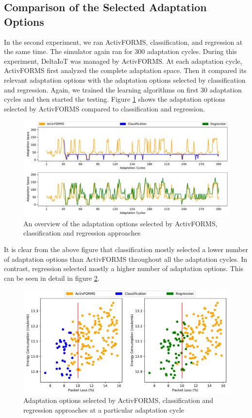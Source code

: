 \documentclass[a4paper,12pt]{article}
\begin{document}
\subsection{Comparison of the Selected Adaptation Options}
In the second experiment, we ran ActivFORMS, classification, and regression at the same time. The simulator again ran for 300 adaptation cycles. During this experiment, DeltaIoT was managed by ActivFORMS. At each adaptation cycle, ActivFORMS first analyzed the complete adaptation space. Then it compared its relevant adaptation options with the adaptation options selected by classification and regression. Again, we trained the learning algorithms on first 30 adaptation cycles and then started the testing. Figure \ref{OnlineLearning} shows the adaptation options selected by ActivFORMS compared to classification and regression.
\begin{figure}[H]
	\centering
	\includegraphics[keepaspectratio, width=\linewidth]{graphs/OnlineLearning.pdf}
	\caption{An overview of the adaptation options selected by ActivFORMS, classification and regression approaches}
	\label{OnlineLearning}
\end{figure}
It is clear from the above figure that classification mostly selected a lower number of adaptation options than ActivFORMS throughout all the adaptation cycles. In contrast, regression selected mostly a higher number of adaptation options. This can be seen in detail in figure \ref{RelevantOptions}.
\begin{figure}[H]
	\centering
	\includegraphics[keepaspectratio, width=\linewidth]{graphs/SelectedAdaptationOptions.pdf}
	\caption{Adaptation options selected by ActivFORMS, classification and regression approaches at a particular adaptation cycle}
	\label{RelevantOptions}
\end{figure}
\end{document}
